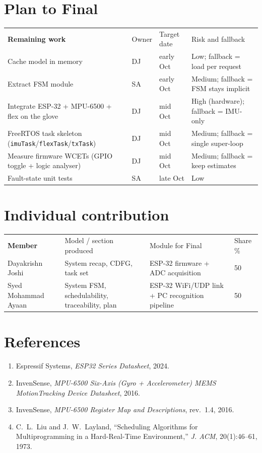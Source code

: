 \documentclass[11pt,a4paper]{article}
\newcommand{\hdrow}[1]{\rowcolor{headbg}\color{headfg}\bfseries #1}
\begin{document}
\section{Plan to Final}
\begin{tabularx}{\textwidth}{@{}X p{1.4cm}p{2.0cm}X@{}}
\hdrow{Remaining work & Owner & Target date & Risk and fallback} \\[1pt]
Cache model in memory & DJ & early Oct & Low; fallback = load per request \\
Extract FSM module & SA & early Oct & Medium; fallback = FSM stays implicit \\
Integrate ESP-32 + MPU-6500 + flex on the glove & DJ & mid Oct & High (hardware); fallback = IMU-only \\
FreeRTOS task skeleton (\texttt{imuTask}/\texttt{flexTask}/\texttt{txTask}) & DJ & mid Oct & Medium; fallback = single super-loop \\
Measure firmware WCETs (GPIO toggle + logic analyser) & DJ & mid Oct & Medium; fallback = keep estimates \\
Fault-state unit tests & SA & late Oct & Low \\
\end{tabularx}

\section{Individual contribution}
\begin{tabularx}{\textwidth}{@{}p{3.6cm}X p{4.2cm}p{1.4cm}@{}}
\hdrow{Member & Model / section produced & Module for Final & Share \%} \\[1pt]
Dayakrishn Joshi & System recap, CDFG, task set & ESP-32 firmware + ADC acquisition & 50 \\
Syed Mohammad Ayaan & System FSM, schedulability, traceability, plan & ESP-32 WiFi/UDP link + PC recognition pipeline & 50 \\
\end{tabularx}

\section*{References}
\small
\begin{enumerate}[leftmargin=1.4em,itemsep=2pt]
\item Espressif Systems, \emph{ESP32 Series Datasheet}, 2024.
\item InvenSense, \emph{MPU-6500 Six-Axis (Gyro + Accelerometer) MEMS MotionTracking Device Datasheet}, 2016.
\item InvenSense, \emph{MPU-6500 Register Map and Descriptions}, rev.~1.4, 2016.
\item C.~L.~Liu and J.~W.~Layland, ``Scheduling Algorithms for Multiprogramming in a Hard-Real-Time Environment,'' \emph{J. ACM}, 20(1):46--61, 1973.
\end{enumerate}
\end{document}
